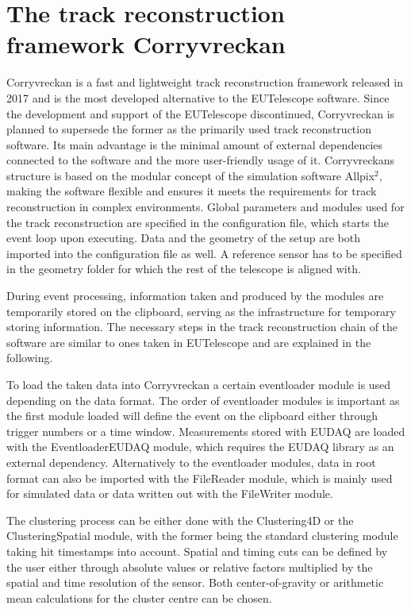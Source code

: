 \section{The track reconstruction framework Corryvreckan}
Corryvreckan is a fast and lightweight track reconstruction framework released in 2017 and is the most developed alternative to the EUTelescope software.
Since the development and support of the EUTelescope discontinued, Corryvreckan is planned to supersede the former as the primarily used track
reconstruction software. Its main advantage is the minimal amount of external dependencies connected to the software and the more user-friendly usage of
it.
Corryvreckans structure is based on the modular concept of the simulation software Allpix$^2$, making the software flexible and ensures it meets the requirements for track reconstruction in
complex environments. Global parameters and modules used for the track reconstruction are specified in the configuration file, which starts the event loop upon
executing. Data and the geometry of the setup are both imported into the configuration file as well. A reference sensor has to be specified in the geometry folder
for which the rest of the telescope is aligned with.

During event processing, information taken and produced by the modules are temporarily stored on the clipboard, serving as the infrastructure for temporary
storing information. %
The necessary steps in the track reconstruction chain of the software are similar to ones taken in EUTelescope and are explained in the following.

To load the taken data into Corryvreckan a certain eventloader module is used depending on the data format. The order of eventloader modules
is important as the first module loaded will define the event on the clipboard either through trigger numbers or a time window. Measurements stored with EUDAQ are loaded with the
EventloaderEUDAQ module, which requires the EUDAQ library as an external dependency. Alternatively to the eventloader modules, data in root format can also be imported
with the FileReader module, which is mainly used for simulated data or data written out with the FileWriter module.

The clustering process can be either done with the Clustering4D or the ClusteringSpatial module, with the former being the standard clustering module taking hit timestamps
into account. Spatial and timing cuts can be defined by the user either through absolute values or relative factors multiplied by the spatial and time resolution of the sensor. Both
center-of-gravity or arithmetic mean calculations for the cluster centre can be chosen.


